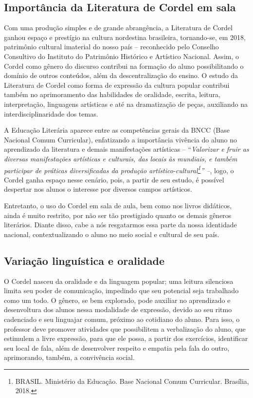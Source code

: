 \documentclass[12pt]{extarticle}
\begin{document}

\subsection{Importância da Literatura de Cordel em sala}

Com uma produção simples e de grande abrangência, a Literatura de Cordel
ganhou espaço e prestígio na cultura nordestina brasileira, tornando-se,
em 2018, patrimônio cultural imaterial do nosso país -- reconhecido pelo
Conselho Consultivo do Instituto do Patrimônio Histórico e Artístico
Nacional. Assim, o Cordel como gênero do discurso contribui na formação
do aluno possibilitando o domínio de outros conteúdos, além da
descentralização do ensino. O estudo da Literatura de Cordel como forma
de expressão da cultura popular contribui também no aprimoramento das
habilidades de oralidade, escrita, leitura, interpretação, linguagens
artísticas e até na dramatização de peças, auxiliando na
interdisciplinaridade dos temas.

A Educação Literária aparece entre as competências gerais da BNCC (Base
Nacional Comum Curricular), enfatizando a importância vivência do aluno
no aprendizado da literatura e demais manifestações artísticas --
``\emph{Valorizar e fruir as diversas manifestações artísticas e
culturais, das locais às mundiais, e também participar de práticas
diversificadas da produção artístico-cultural\footnote{BRASIL. Ministério da Educação. Base Nacional Comum Curricular.
Brasília, 2018.}'' --},
logo, o Cordel ganha espaço nesse cenário, pois, a partir de seu estudo,
é possível despertar nos alunos o interesse por diversos campos
artísticos.

Entretanto, o uso do Cordel em sala de aula, bem como nos livros
didáticos, ainda é muito restrito, por não ser tão prestigiado quanto os
demais gêneros literários. Diante disso, cabe a nós resgatarmos essa
parte da nossa identidade nacional, contextualizando o aluno no meio
social e cultural de seu país.

\subsection{Variação linguística e oralidade}

O Cordel nasceu da oralidade e da linguagem popular; uma leitura
silenciosa limita seu poder de comunicação, impedindo que seu potencial
seja trabalhado como um todo. O gênero, se bem explorado, pode auxiliar
no aprendizado e desenvoltura dos alunos nessa modalidade de expressão,
devido ao seu ritmo cadenciado e seu linguajar comum, próximo ao
cotidiano do aluno. Para isso, o professor deve promover atividades que
possibilitem a verbalização do aluno, que estimulem a livre expressão,
para que ele possa, a partir dos exercícios, identificar seu local de
fala, além de desenvolver respeito e empatia pela fala do outro,
aprimorando, também, a convivência social.
\end{document}
